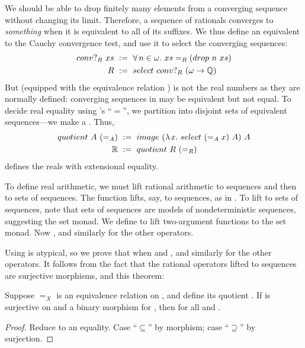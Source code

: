 We should be able to drop finitely many elements from a converging sequence without changing its limit. Therefore, a sequence of rationals converges to \emph{something} when it is equivalent to all of its suffixes. We thus define an equivalent to the Cauchy convergence test, and use it to select the converging sequences:
\begin{equation}
\begin{aligned}
  conv?_R~xs&\ :=\  \forall\,{n \in \omega}\ldotp\, xs =_R (drop~n~xs) \\
  R&\ :=\ select~conv?_R~(\omega \to \mathbb{Q})
\end{aligned}
\end{equation}
But  (equipped with the equivalence relation ) is not the real numbers as they are normally defined: converging sequences in  may be equivalent but not equal. To decide real equality using \targetlang's ``$=$'', we partition  into disjoint sets of equivalent sequences---we make a . Thus,
\begin{equation}
\begin{aligned}
  quotient~A~(=_A)&\ :=\ image~(\lambda\mspace{2mu}{x}\ldotp\, select~(=_A x)~A)~A \\
  \mathbb{R}&\ :=\ quotient~R~(=_R)
\end{aligned}
\end{equation}
defines the reals with extensional equality.

To define real arithmetic, we must lift rational arithmetic to sequences and then to sets of sequences. The  function lifts, say, \tlzfc{+_\Rat} to sequences, as in . To lift  to sets of sequences, note that sets of sequences are models of nondeterministic sequences, suggesting the set monad. We define
to lift two-argument functions to the set monad. Now , and similarly for the other operators.

Using  is atypical, so we prove that  when  and , and similarly for the other operators. It follows from the fact that the rational operators lifted to sequences are surjective morphisms, and this theorem:

\begin{theorem}
\label{thm:set-monad-okay}
\newcommand{\X}{\mathbb{X}}
Suppose $=_X$ is an equivalence relation on , and define its quotient \tlzfc{\X \objdef quotient~X~(=_X)}. If  is surjective on  and a binary morphism for , then \tlzfc{(lift2_{set}~op~A~B) \in \X} for all \tlzfc{A \in \X} and \tlzfc{B \in \X}.
\end{theorem}
\begin{proof}
Reduce to an equality. Case ``$\subseteq$'' by morphism; case ``$\supseteq$'' by surjection.
\end{proof}

